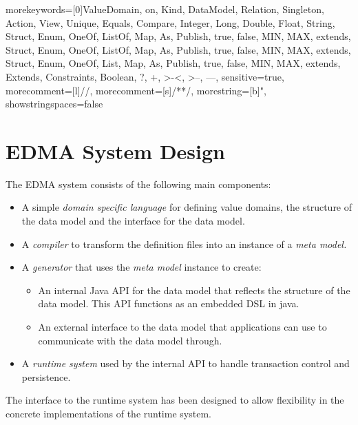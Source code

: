 %
  {
	morekeywords={[0]ValueDomain, on, Kind, DataModel, Relation, Singleton, Action, View, Unique, Equals, Compare, Integer, Long, Double, Float, String, Struct, Enum, OneOf, ListOf, Map, As, Publish, true, false, MIN, MAX, extends, Struct, Enum, OneOf, ListOf, Map, As, Publish, true, false, MIN, MAX, extends, Struct, Enum, OneOf, List, Map, As, Publish, true, false, MIN, MAX, extends, Extends, Constraints, Boolean, ?, +, >-<, >--, ---},
    sensitive=true,
	morecomment=[l]{//},
	morecomment=[s]{/*}{*/},
	morestring=[b]",
	showstringspaces=false
}%
%
%
%
\lstset{xleftmargin=0.5cm,basicstyle=\small, tabsize=3}


\section{EDMA System Design}



The EDMA system consists of the following main components:
\begin{itemize}
\item A simple \emph{domain specific language} for defining value domains,
the structure of the data model and the interface for the data model.
\item A \emph{compiler} to transform the definition files into an instance
of a \emph{meta model.}
\item A \emph{generator} that uses the \emph{meta model} instance to create: 

\begin{itemize}
\item An internal Java API for the data model that reflects the structure
of the data model. This API functions as an embedded DSL in java.
\item An external interface to the data model that applications can use
to communicate with the data model through.
\end{itemize}
\item A \emph{runtime system} used by the internal API to handle transaction
control and persistence.
\end{itemize}
The interface to the runtime system has been designed to allow flexibility
in the concrete implementations of the runtime system.


